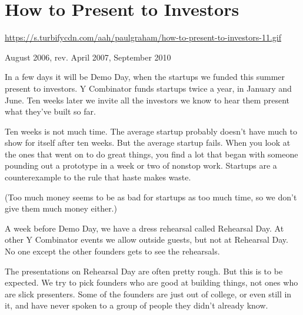 \chapter{How to Present to Investors}


            
              
                \href{https://s.turbifycdn.com/aah/paulgraham/how-to-present-to-investors-11.gif}{https://s.turbifycdn.com/aah/paulgraham/how-to-present-to-investors-11.gif}




                  
                    August 2006, rev. April 2007, September 2010

In a
                    few days it will be Demo Day, when the startups we funded
                    this summer present to investors. Y Combinator funds
                    startups twice a year, in January and June. Ten weeks later
                    we invite all the investors we know to hear them present
                    what they've built so far.

Ten weeks is not much
                    time. The average startup probably doesn't have much to show
                    for itself after ten weeks. But the average startup fails.
                    When you look at the ones that went on to do great things,
                    you find a lot that began with someone pounding out a
                    prototype in a week or two of nonstop work. Startups are a
                    counterexample to the rule that haste makes waste.

(Too
                    much money seems to be as bad for startups as too much time,
                    so we don't give them much money either.)

A week
                    before Demo Day, we have a dress rehearsal called Rehearsal
                    Day. At other Y Combinator events we allow outside guests,
                    but not at Rehearsal Day. No one except the other founders
                    gets to see the rehearsals.

The presentations on
                    Rehearsal Day are often pretty rough. But this is to be
                    expected. We try to pick founders who are good at building
                    things, not ones who are slick presenters. Some of the
                    founders are just out of college, or even still in it, and
                    have never spoken to a group of people they didn't already
                    know.

